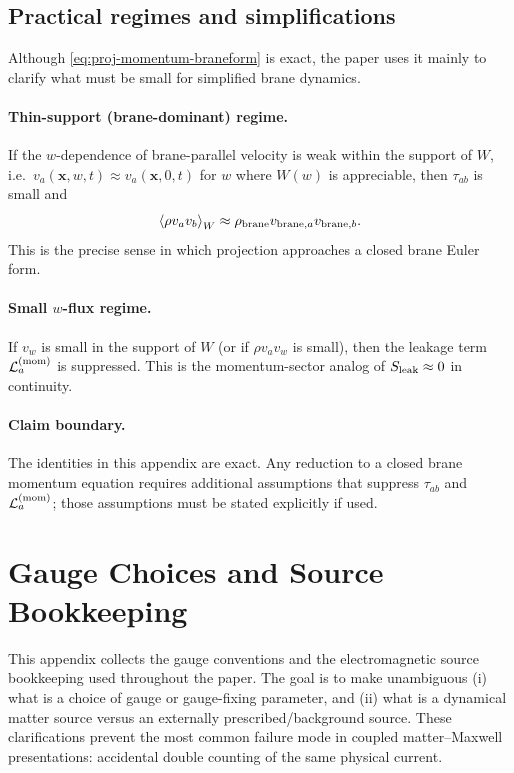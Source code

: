 \documentclass[11pt]{article}
\begin{document}
\subsection{Practical regimes and simplifications}
\label{app:momentum-regimes}

Although \eqref{eq:proj-momentum-braneform} is exact, the paper uses it mainly to clarify what must be small for simplified brane dynamics.

\paragraph{Thin-support (brane-dominant) regime.}
If the $w$-dependence of brane-parallel velocity is weak within the support of $W$, i.e.\ $v_a(\mathbf{x},w,t)\approx v_a(\mathbf{x},0,t)$ for $w$ where $W(w)$ is appreciable, then $\tau_{ab}$ is small and
\begin{equation}
\left\langle \rho v_a v_b \right\rangle_W \approx \rho_{\rm brane} v_{{\rm brane},a} v_{{\rm brane},b}.
\end{equation}
This is the precise sense in which projection approaches a closed brane Euler form.

\paragraph{Small \texorpdfstring{$w$}{w}-flux regime.}
If $v_w$ is small in the support of $W$ (or if $\rho v_a v_w$ is small), then the leakage term $\mathcal{L}^{({\rm mom})}_a$ is suppressed. This is the momentum-sector analog of $S_{\rm leak}\approx 0$ in continuity.

\paragraph{Claim boundary.}
The identities in this appendix are exact. Any reduction to a closed brane momentum equation requires additional assumptions that suppress $\tau_{ab}$ and $\mathcal{L}^{({\rm mom})}_a$; those assumptions must be stated explicitly if used.

\section{Gauge Choices and Source Bookkeeping}
\label{app:gauge}

This appendix collects the gauge conventions and the electromagnetic source bookkeeping used throughout the paper. The goal is to make unambiguous (i) what is a choice of gauge or gauge-fixing parameter, and (ii) what is a dynamical matter source versus an externally prescribed/background source. These clarifications prevent the most common failure mode in coupled matter--Maxwell presentations: accidental double counting of the same physical current.
\end{document}

